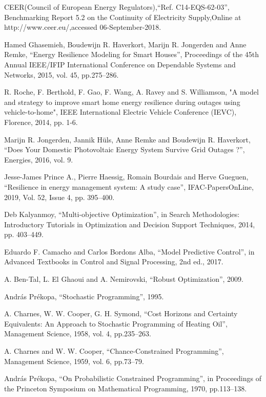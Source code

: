 \documentclass[conference]{IEEEtran}
\begin{document}
\begin{thebibliography}{00}


 CEER(Council of European Energy Regulators),``Ref. C14-EQS-62-03'', Benchmarking Report 5.2 on the Continuity of Electricity Supply,Online at http://www.ceer.eu/,accessed 06-September-2018.

 Hamed Ghasemieh, Boudewijn R. Haverkort, Marijn R. Jongerden and Anne Remke, ``Energy Resilience Modeling for Smart Houses'', Proceedings of the 45th Annual IEEE/IFIP International Conference on Dependable Systems and Networks, 2015, vol. 45, pp.275--286.

 R. Roche, F. Berthold, F. Gao, F. Wang, A. Ravey and S. Williamson, "A model and strategy to improve smart home energy resilience during outages using vehicle-to-home", IEEE International Electric Vehicle Conference (IEVC), Florence, 2014, pp. 1-6.

 Marijn R. Jongerden, Jannik Hüls, Anne Remke and Boudewijn R. Haverkort, ``Does Your Domestic Photovoltaic Energy System Survive Grid Outages ?'', Energies, 2016, vol. 9.

 Jesse-James Prince A., Pierre Haessig, Romain Bourdais and Herve Gueguen, ``Resilience in energy management system: A study case'', IFAC-PapersOnLine, 2019, Vol. 52, Issue 4, pp. 395--400.

 Deb Kalyanmoy, ``Multi-objective Optimization'', in Search Methodologies: Introductory Tutorials in Optimization and Decision Support Techniques, 2014, pp. 403--449.

 Eduardo F. Camacho and Carlos Bordons Alba, ``Model Predictive Control'', in Advanced Textbooks in Control and Signal Processing, 2nd ed., 2017.

 A. Ben-Tal, L. El Ghaoui  and A. Nemirovski, ``Robust Optimization'', 2009.

 Andr\'as Pr\'ekopa, ``Stochastic Programming'', 1995.

 A. Charnes, W. W. Cooper, G. H. Symond, ``Cost Horizons and Certainty Equivalents: An Approach to Stochastic Programming of Heating Oil'', Management Science, 1958, vol. 4, pp.235--263.

 A. Charnes and W. W. Cooper, ``Chance-Constrained Programming'', Management Science, 1959, vol. 6, pp.73--79.

 Andr\'as Pr\'ekopa, ``On Probabilistic Constrained Programming'', in  Proceedings of the Princeton Symposium on Mathematical Programming, 1970, pp.113--138.


\end{thebibliography}
\end{document}
